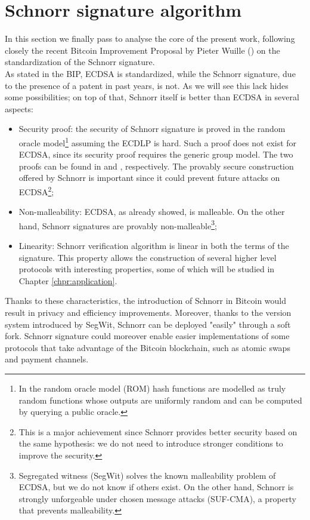 \bigskip

\bigskip

\section{Schnorr signature algorithm}
\label{schnorr}
In this section we finally pass to analyse the core of the present work, following closely the recent Bitcoin Improvement Proposal by Pieter Wuille (\cite{RefWork:5}) on the standardization of the Schnorr signature.
\\
As stated in the BIP, ECDSA is standardized, while the Schnorr signature, due to the presence of a patent in past years, is not. As we will see this lack hides some possibilities; on top of that, Schnorr itself is better than ECDSA in several aspects:
\begin{itemize}
	\item Security proof: the security of Schnorr signature is proved in the random oracle model\footnote{In the random oracle model (ROM) hash functions are modelled as truly random functions whose outputs are uniformly random and can be computed by querying a public oracle.} assuming the ECDLP is hard. Such a proof does not exist for ECDSA, since its security proof requires the generic group model. The two proofs can be found in \cite{RefWork:8} and \cite{RefWork:9}, respectively. The provably secure construction offered by Schnorr is important since it could prevent future attacks on ECDSA\footnote{This is a major achievement since Schnorr provides better security based on the same hypothesis: we do not need to introduce stronger conditions to improve the security.};
	\item Non-malleability: ECDSA, as already showed, is malleable. On the other hand, Schnorr signatures are provably non-malleable\footnote{Segregated witness (SegWit) solves the known malleability problem of ECDSA, but we do not know if others exist. On the other hand, Schnorr is strongly unforgeable under chosen message attacks (SUF-CMA), a property that prevents malleability.};
	\item Linearity: Schnorr verification algorithm is linear in both the terms of the signature. This property allows the construction of several higher level protocols with interesting properties, some of which will be studied in Chapter \ref{chpr:application}.
\end{itemize}
Thanks to these characteristics, the introduction of Schnorr in Bitcoin would result in privacy and efficiency improvements. Moreover, thanks to the version system introduced by SegWit, Schnorr can be deployed "easily" through a soft fork. Schnorr signature could moreover enable easier implementations of some protocols that take advantage of the Bitcoin blockchain, such as atomic swaps and payment channels.

